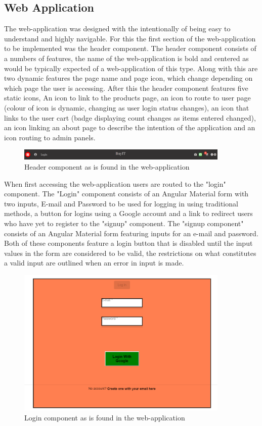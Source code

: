 \subsection{Web Application}
The web-application was designed with the intentionally of being easy to understand and highly navigable. For this the first section of the web-application to be implemented was the header component. The header component consists of a numbers of features, the name of the web-application is bold and centered as would be typically expected of a web-application of this type. Along with this are two dynamic features the page name and page icon, which change depending on which page the user is accessing. After this the header component features five static icons, An icon to link to the products page, an icon to route to user page (colour of icon is dynamic, changing as user login status changes), an icon that links to the user cart (badge displaying count changes as items entered changed), an icon linking an about page to describe the intention of the application and an icon routing to admin panels. 

\begin{figure}[h!]
    	\caption{Header component as is found in the web-application}
	\centering
	\includegraphics[width=0.9\textwidth]{images/header.png}
\end{figure}

\newpage
When first accessing the web-application users are routed to the "login" component. The "Login" component consists of an Angular Material form with two inputs, E-mail and Password to be used for logging in using traditional methods, a button for logins using a Google account and a link to redirect users who have yet to register to the "signup" component. The "signup component" consists of an Angular Material form featuring inputs for an e-mail and password. Both of these components feature a login button that is disabled until the input values in the form are considered to be valid, the restrictions on what constitutes a valid input are outlined when an error in input is made.

\begin{figure}[h!]
    	\caption{Login component as is found in the web-application}
	\centering
	\includegraphics[width=0.9\textwidth]{images/login.png}
\end{figure}

